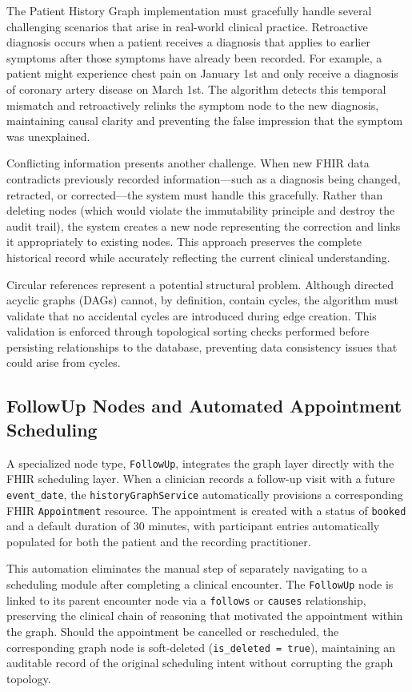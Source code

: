 The Patient History Graph implementation must gracefully handle several
challenging scenarios that arise in real-world clinical practice. Retroactive
diagnosis occurs when a patient receives a diagnosis that applies to earlier
symptoms after those symptoms have already been recorded. For example, a
patient might experience chest pain on January 1st and only receive a diagnosis
of coronary artery disease on March 1st. The algorithm detects this temporal
mismatch and retroactively relinks the symptom node to the new diagnosis,
maintaining causal clarity and preventing the false impression that the symptom
was unexplained.

Conflicting information presents another challenge. When new FHIR data
contradicts previously recorded information---such as a diagnosis being
changed, retracted, or corrected---the system must handle this gracefully.
Rather than deleting nodes (which would violate the immutability principle and
destroy the audit trail), the system creates a new node representing the
correction and links it appropriately to existing nodes. This approach
preserves the complete historical record while accurately reflecting the
current clinical understanding.

Circular references represent a potential structural problem. Although directed
acyclic graphs (DAGs) cannot, by definition, contain cycles, the algorithm must
validate that no accidental cycles are introduced during edge creation. This
validation is enforced through topological sorting checks performed before
persisting relationships to the database, preventing data consistency issues
that could arise from cycles.

\subsection{FollowUp Nodes and Automated Appointment Scheduling}
\label{subsec:followup_nodes}

A specialized node type, \texttt{FollowUp}, integrates the graph layer directly
with the FHIR scheduling layer. When a clinician records a follow-up visit with
a future \texttt{event\_date}, the \texttt{historyGraphService} automatically
provisions a corresponding FHIR \texttt{Appointment} resource. The appointment
is created with a status of \texttt{booked} and a default duration of 30
minutes, with participant entries automatically populated for both the patient
and the recording practitioner.

This automation eliminates the manual step of separately navigating to a
scheduling module after completing a clinical encounter. The \texttt{FollowUp}
node is linked to its parent encounter node via a \texttt{follows} or
\texttt{causes} relationship, preserving the clinical chain of reasoning that
motivated the appointment within the graph. Should the appointment be cancelled
or rescheduled, the corresponding graph node is soft-deleted
(\texttt{is\_deleted = true}), maintaining an auditable record of the original
scheduling intent without corrupting the graph topology.

